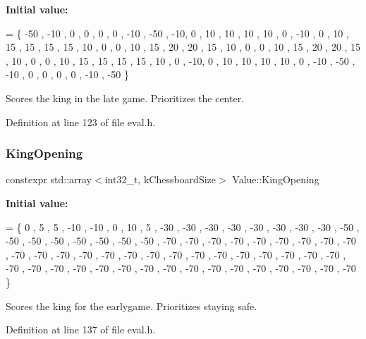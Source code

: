 {\bfseries Initial value\+:}
\begin{DoxyCode}
= \{ 
        -50 ,   -10 ,   0   ,   0   ,   0   ,   0   ,   -10 ,   -50 ,
        -10,    0   ,   10  ,   10  ,   10  ,   10  ,   0   ,   -10 ,
        0   ,   10  ,   15  ,   15  ,   15  ,   15  ,   10  ,   0   ,
        0   ,   10  ,   15  ,   20  ,   20  ,   15  ,   10  ,   0   ,
        0   ,   10  ,   15  ,   20  ,   20  ,   15  ,   10  ,   0   ,
        0   ,   10  ,   15  ,   15  ,   15  ,   15  ,   10  ,   0   ,
        -10,    0   ,   10  ,   10  ,   10  ,   10  ,   0   ,   -10 ,
        -50 ,   -10 ,   0   ,   0   ,   0   ,   0   ,   -10 ,   -50 
    \}
\end{DoxyCode}


Scores the king in the late game. Prioritizes the center. 



Definition at line 123 of file eval.\+h.

\mbox{\label{namespaceValue_a0b4d4bb236eb7c18c48df42e6e3ca1fd}} 
\subsubsection{\texorpdfstring{King\+Opening}{KingOpening}}
{\footnotesize\ttfamily constexpr std\+::array$<$int32\+\_\+t, k\+Chessboard\+Size$>$ Value\+::\+King\+Opening}

{\bfseries Initial value\+:}
\begin{DoxyCode}
= \{ 
        0   ,   5   ,   5   ,   -10 ,   -10 ,   0   ,   10  ,   5   ,
        -30 ,   -30 ,   -30 ,   -30 ,   -30 ,   -30 ,   -30 ,   -30 ,
        -50 ,   -50 ,   -50 ,   -50 ,   -50 ,   -50 ,   -50 ,   -50 ,
        -70 ,   -70 ,   -70 ,   -70 ,   -70 ,   -70 ,   -70 ,   -70 ,
        -70 ,   -70 ,   -70 ,   -70 ,   -70 ,   -70 ,   -70 ,   -70 ,
        -70 ,   -70 ,   -70 ,   -70 ,   -70 ,   -70 ,   -70 ,   -70 ,
        -70 ,   -70 ,   -70 ,   -70 ,   -70 ,   -70 ,   -70 ,   -70 ,
        -70 ,   -70 ,   -70 ,   -70 ,   -70 ,   -70 ,   -70 ,   -70     
    \}
\end{DoxyCode}


Scores the king for the earlygame. Prioritizes staying safe. 



Definition at line 137 of file eval.\+h.

\mbox{\label{namespaceValue_a4b65a409f1e288260d4e71d6c13376b5}} 
